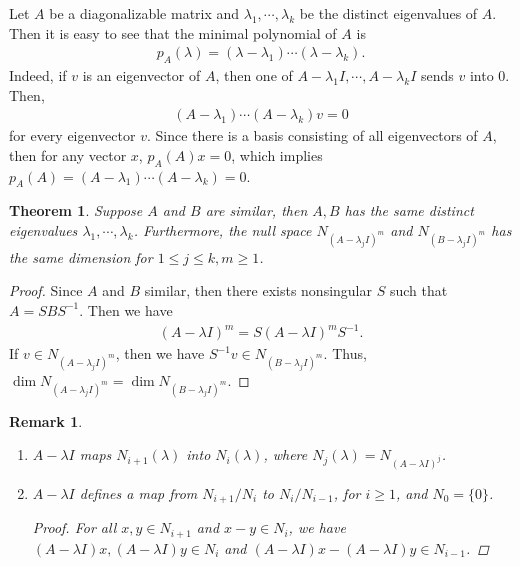 \documentclass[11pt]{book}
\newtheorem{theorem}{Theorem}[section]
\newtheorem{remark}{Remark}[section]
\theoremstyle{definition}
\numberwithin{equation}{chapter}
\begin{document}
\medskip

Let $A$ be a diagonalizable matrix and $\lambda_1, \cdots, \lambda_k$ be the distinct eigenvalues of $A$. Then it is easy to see that the minimal polynomial of $A$ is 
\begin{align*}
    p_A(\lambda) = (\lambda - \lambda_1) \cdots (\lambda - \lambda_k).
\end{align*}
Indeed, if $v$ is an eigenvector of $A$, then one of $A - \lambda_1 I, \cdots, A - \lambda_k I$ sends $v$ into $0$. Then,
\begin{align*}
    (A - \lambda_1) \cdots (A - \lambda_k) v = 0
\end{align*}
for every eigenvector $v$. Since there is a basis consisting of all eigenvectors of $A$, then for any vector $x$, $p_A(A)x = 0$, which implies $p_A(A) = (A - \lambda_1) \cdots (A - \lambda_k) = 0$.

\medskip

\begin{theorem}
Suppose $A$ and $B$ are similar, then $A, B$ has the same distinct eigenvalues $\lambda_1, \cdots, \lambda_k$. Furthermore, the null space $N_{(A-\lambda_j I)^m}$ and $N_{(B-\lambda_j I)^m}$ has the same dimension for $1\leq j \leq k, m \geq 1$.
\end{theorem}
\begin{proof}
Since $A$ and $B$ similar, then there exists nonsingular $S$ such that $A = SBS^{-1}$. Then we have 
\begin{align*}
    (A - \lambda I)^m = S(A - \lambda I)^m S^{-1}.
\end{align*}
If $v\in N_{(A-\lambda_j I)^m}$, then we have $S^{-1}v\in N_{(B-\lambda_j I)^m}$. Thus, $\dim N_{(A-\lambda_j I)^m} = \dim N_{(B-\lambda_j I)^m}$.
\end{proof}

\begin{remark}
~\begin{enumerate}[label=(\alph*)]
    \item $A - \lambda I$ maps $N_{i+1}(\lambda)$ into $N_{i}(\lambda)$, where $N_{j}(\lambda) = N_{(A - \lambda I)^j}$.
    \item $A - \lambda I$ defines a map from $N_{i+1}/N_i$ to $N_i/N_{i-1}$, for $i\geq 1$, and $N_0 = \{0\}$.
    \begin{proof}
    For all $x,y\in N_{i+1}$ and $x-y\in N_{i}$, we have $(A - \lambda I)x, (A - \lambda I)y \in N_{i}$ and $(A - \lambda I)x - (A - \lambda I)y \in N_{i-1}$.
    \end{proof}
\end{enumerate}
\end{remark}
\end{document}
